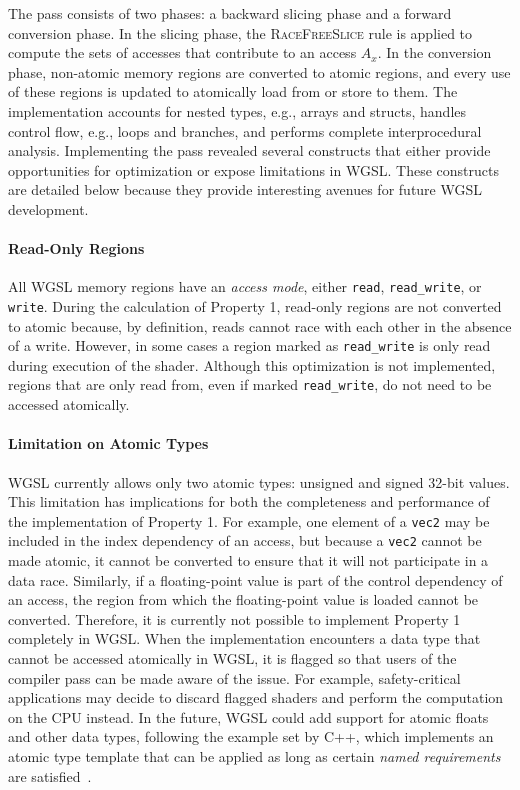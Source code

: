 The pass consists of two phases: a backward slicing phase and a forward conversion phase. In the slicing phase, the \textsc{RaceFreeSlice} rule is applied to compute the sets of accesses that contribute to an access $A_x$. In the conversion phase, non-atomic memory regions are converted to atomic regions, and every use of these regions is updated to atomically load from or store to them. The implementation accounts for nested types, e.g., arrays and structs, handles control flow, e.g., loops and branches, and performs complete interprocedural analysis. Implementing the pass revealed several constructs that either provide opportunities for optimization or expose limitations in WGSL. These constructs are detailed below because they provide interesting avenues for future WGSL development.

\paragraph{Read-Only Regions} All WGSL memory regions have an \textit{access mode}, either \texttt{read}, \texttt{read\_write}, or \texttt{write}. During the calculation of Property 1, read-only regions are not converted to atomic because, by definition, reads cannot race with each other in the absence of a write. However, in some cases a region marked as \texttt{read\_write} is only read during execution of the shader. Although this optimization is not implemented, regions that are only read from, even if marked \texttt{read\_write}, do not need to be accessed atomically.

\paragraph{Limitation on Atomic Types} WGSL currently allows only two atomic types: unsigned and signed 32-bit values. This limitation has implications for both the completeness and performance of the implementation of Property 1. For example, one element of a \texttt{vec2} may be included in the index dependency of an access, but because a \texttt{vec2} cannot be made atomic, it cannot be converted to ensure that it will not participate in a data race. Similarly, if a floating-point value is part of the control dependency of an access, the region from which the floating-point value is loaded cannot be converted. Therefore, it is currently not possible to implement Property 1 completely in WGSL. When the implementation encounters a data type that cannot be accessed atomically in WGSL, it is flagged so that users of the compiler pass can be made aware of the issue. For example, safety-critical applications may decide to discard flagged shaders and perform the computation on the CPU instead. In the future, WGSL could add support for atomic floats and other data types, following the example set by C++, which implements an atomic type template that can be applied as long as certain \textit{named requirements} are satisfied~\cite{cppreferenceAtomic}.

